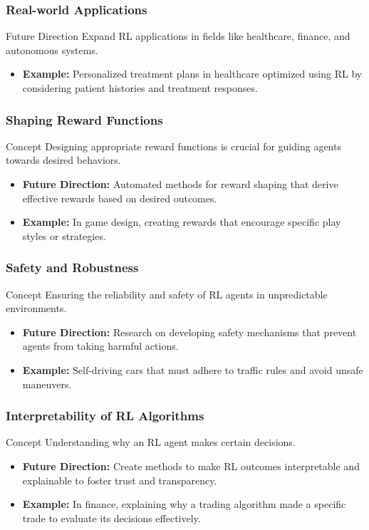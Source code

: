 \documentclass[aspectratio=169]{beamer}
\begin{document}
\begin{frame}
    \frametitle{Real-world Applications}
    \begin{block}{Future Direction}
        Expand RL applications in fields like healthcare, finance, and autonomous systems.
    \end{block}
    \begin{itemize}
        \item \textbf{Example:} Personalized treatment plans in healthcare optimized using RL by considering patient histories and treatment responses.
    \end{itemize}
\end{frame}

\begin{frame}
    \frametitle{Shaping Reward Functions}
    \begin{block}{Concept}
        Designing appropriate reward functions is crucial for guiding agents towards desired behaviors.
    \end{block}
    \begin{itemize}
        \item \textbf{Future Direction:} Automated methods for reward shaping that derive effective rewards based on desired outcomes.
        \item \textbf{Example:} In game design, creating rewards that encourage specific play styles or strategies.
    \end{itemize}
\end{frame}

\begin{frame}
    \frametitle{Safety and Robustness}
    \begin{block}{Concept}
        Ensuring the reliability and safety of RL agents in unpredictable environments.
    \end{block}
    \begin{itemize}
        \item \textbf{Future Direction:} Research on developing safety mechanisms that prevent agents from taking harmful actions.
        \item \textbf{Example:} Self-driving cars that must adhere to traffic rules and avoid unsafe maneuvers.
    \end{itemize}
\end{frame}

\begin{frame}
    \frametitle{Interpretability of RL Algorithms}
    \begin{block}{Concept}
        Understanding why an RL agent makes certain decisions.
    \end{block}
    \begin{itemize}
        \item \textbf{Future Direction:} Create methods to make RL outcomes interpretable and explainable to foster trust and transparency.
        \item \textbf{Example:} In finance, explaining why a trading algorithm made a specific trade to evaluate its decisions effectively.
    \end{itemize}
\end{frame}
\end{document}
